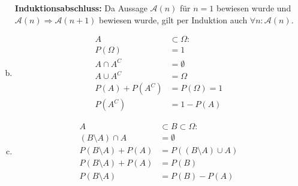 \documentclass[parskip=half,a4paper]{scrartcl}
\begin{document}
\begin{enumerate}[(a)]
\textbf{Induktionsabschluss:} Da Aussage $\mathcal{A}(n)$ für $n=1$ bewiesen wurde und $\mathcal{A}(n) \Rightarrow \mathcal{A}(n+1)$ bewiesen wurde, gilt per Induktion auch $\forall n: \mathcal{A}(n)$.

\item
\begin{align*}
    A &\subset \Omega:\\
    P(\Omega) &= 1\\
    A \cap A^C &= \emptyset\\
    A \cup A^C & = \Omega\\
    P(A) + P(A^C) &= P(\Omega) = 1\\
    P(A^C) &= 1 - P(A)
\end{align*}




\item

\begin{align*}
    A &\subset B \subset \Omega:\\
    (B \setminus A) \cap A &= \emptyset\\
    P(B\setminus A) + P(A) &= P((B\setminus A) \cup A)\\
    P(B\setminus A) + P(A) &= P(B)\\
    P(B\setminus A) &= P(B) - P(A)
\end{align*}
\end{enumerate}
\end{document}
